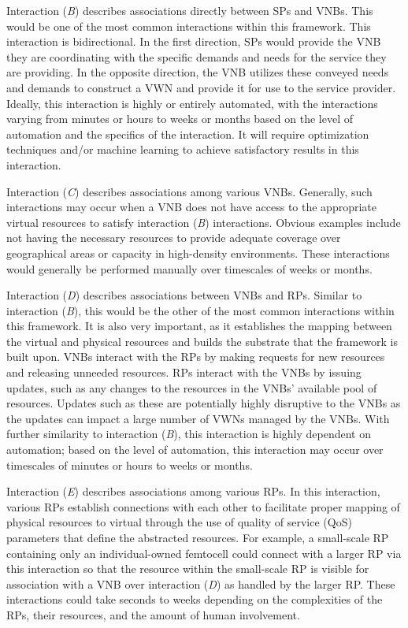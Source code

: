 \documentclass[12pt,dvipsnames]{report}
\begin{document}
Interaction (\emph{B}) describes associations directly between SPs and VNBs.  This would be one of the most common interactions within this framework.  This interaction is bidirectional.  In  the first direction, SPs would provide the VNB they are coordinating with the specific demands and needs for the service they are providing.  In the opposite direction, the VNB utilizes these conveyed needs and demands to construct a VWN and provide it for use to the service provider.  Ideally, this interaction is highly or entirely automated, with the interactions varying from minutes or hours to weeks or months based on the level of automation and the specifics of the interaction.  It will require optimization techniques and/or machine learning to achieve satisfactory results in this interaction.

Interaction (\emph{C}) describes associations among various VNBs.  Generally, such interactions may occur when a VNB does not have access to the appropriate virtual resources to satisfy interaction (\emph{B}) interactions.  Obvious examples include not having the necessary resources to provide adequate coverage over geographical areas or capacity in high-density environments.  These interactions would generally be performed manually over timescales of weeks or months.

Interaction (\emph{D}) describes associations between VNBs and RPs.  Similar to interaction (\emph{B}), this would be the other of the most common interactions within this framework.  It is also very important, as it establishes the mapping between the virtual and physical resources and builds the substrate that the framework is built upon.  VNBs interact with the RPs by making requests for new resources and releasing unneeded resources.  RPs interact with the VNBs by issuing updates, such as any changes to the resources in the VNBs' available pool of resources.  Updates such as these are potentially highly disruptive to the VNBs as the updates can impact a large number of VWNs managed by the VNBs.  With further similarity to interaction (\emph{B}), this interaction is highly dependent on automation; based on the level of automation, this interaction may occur over timescales of minutes or hours to weeks or months.

Interaction (\emph{E}) describes associations among various RPs.  In this interaction, various RPs establish connections with each other to facilitate proper mapping of physical resources to virtual through the use of quality of service (QoS) parameters that define the abstracted resources.  For example, a small-scale RP containing only an individual-owned femtocell could connect with a larger RP via this interaction so that the resource within the small-scale RP is visible for association with a VNB over interaction (\emph{D}) as handled by the larger RP.  These interactions could take seconds to weeks depending on the complexities of the RPs, their resources, and the amount of human involvement.
\end{document}
